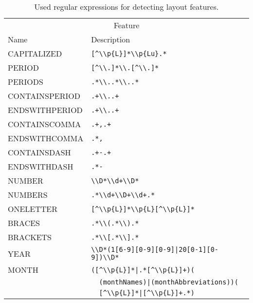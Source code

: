 \begin{table}[h]
\centering
\begin{tabular}{l l}
  \toprule
  \multicolumn{2}{c}{Feature}\\
   Name            & Description\\
  \midrule
   CAPITALIZED     &\verb$[^\\p{L}]*\\p{Lu}.*$\\
   PERIOD          &\verb$[^\\.]*\\.[^\\.]*$\\
   PERIODS         &\verb$.*\\..*\\..*$\\
   CONTAINSPERIOD  &\verb$.+\\..+$\\
   ENDSWITHPERIOD  &\verb$.+\\..+$\\
   CONTAINSCOMMA   &\verb$.+,.+$\\
   ENDSWITHCOMMA   &\verb$.*,$\\
   CONTAINSDASH    &\verb$.+-.+$\\
   ENDSWITHDASH    &\verb$.*-$\\
   NUMBER          &\verb$\\D*\\d+\\D*$\\
   NUMBERS         &\verb$.*\\d+\\D+\\d+.*$\\
   ONELETTER       &\verb$[^\\p{L}]*\\p{L}[^\\p{L}]*$\\
   BRACES          &\verb$.*\\(.*\\).*$\\
   BRACKETS        &\verb$.*\\[.*\\].*$\\
   YEAR            &\verb$\\D*(1[6-9][0-9][0-9]|20[0-1][0-9])\\D*$\\
   MONTH           &\verb$([^\\p{L}]*|.*[^\\p{L}]+)($\\
                   &\verb$  (monthNames)|(monthAbbreviations))($\\
                   &\verb$  [^\\p{L}]*|[^\\p{L}]+.*)$\\
  \bottomrule
\end{tabular}
\caption{Used regular expressions for detecting layout features.}
\label{tab:our-features}
\end{table}

